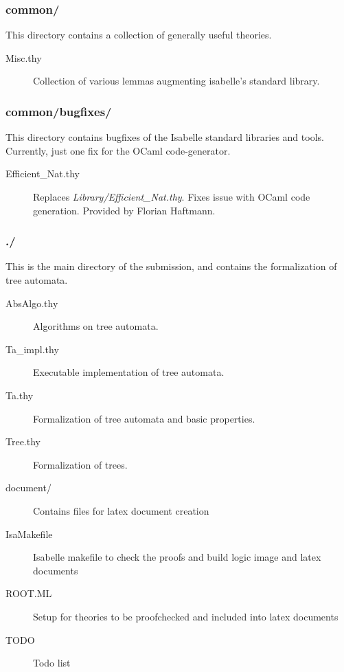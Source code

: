 \subsubsection{common/}
  This directory contains a collection of generally useful theories. 
  \begin{description}
    \item[Misc.thy] Collection of various lemmas augmenting isabelle's standard library.
  \end{description}

\subsubsection{common/bugfixes/}
  This directory contains bugfixes of the Isabelle standard libraries and tools. Currently, just one fix for the OCaml code-generator.
  \begin{description}
    \item[Efficient\_Nat.thy] Replaces {\em Library/Efficient\_Nat.thy}. Fixes issue with OCaml code generation. Provided by Florian Haftmann.
  \end{description}

\subsubsection{./}
  This is the main directory of the submission, and contains the formalization of tree automata.
  \begin{description}
    \item[AbsAlgo.thy] Algorithms on tree automata.
    \item[Ta\_impl.thy] Executable implementation of tree automata.
    \item[Ta.thy] Formalization of tree automata and basic properties.
    \item[Tree.thy] Formalization of trees.
  \end{description}

  \begin{description}
    \item[document/] Contains files for latex document creation
    \item[IsaMakefile] Isabelle makefile to check the proofs and build logic image and latex documents
    \item[ROOT.ML] Setup for theories to be proofchecked and included into latex documents
    \item[TODO] Todo list
  \end{description}


